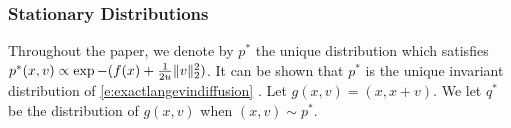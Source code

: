 \subsubsection{Stationary Distributions}
Throughout the paper, we denote by $p^*$ the unique distribution which satisfies $p^*(x,v) \propto \exp{-(f(x)+\frac{1}{2u}\lVert v\rVert_2^2)}$.
It can be shown that $p^*$ is the unique invariant distribution of \eqref{e:exactlangevindiffusion} \citep[see Proposition 6.1 in][]{pav}. Let $g(x,v) = (x,x+v)$. We let $q^*$ be the distribution of $g(x,v)$ when $(x,v) \sim p^*$.

